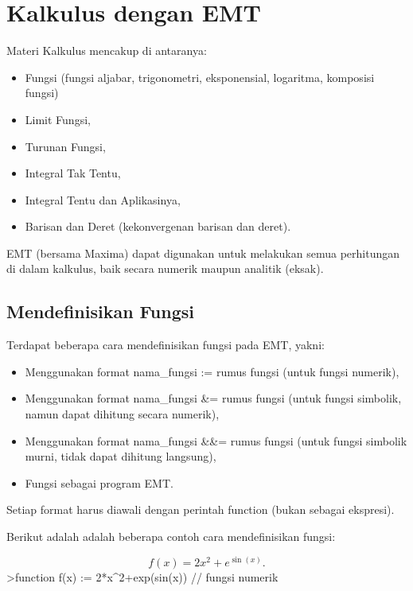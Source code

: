 \documentclass[
]{book}
\author{}
\date{}
\begin{document}
\frontmatter

\mainmatter
\chapter{Kalkulus dengan EMT}\label{kalkulus-dengan-emt}

Materi Kalkulus mencakup di antaranya:

\begin{itemize}
\item
  Fungsi (fungsi aljabar, trigonometri, eksponensial, logaritma, komposisi fungsi)
\item
  Limit Fungsi,
\item
  Turunan Fungsi,
\item
  Integral Tak Tentu,
\item
  Integral Tentu dan Aplikasinya,
\item
  Barisan dan Deret (kekonvergenan barisan dan deret).
\end{itemize}

EMT (bersama Maxima) dapat digunakan untuk melakukan semua perhitungan di dalam kalkulus, baik secara numerik maupun analitik (eksak).

\section{Mendefinisikan Fungsi}\label{mendefinisikan-fungsi}

Terdapat beberapa cara mendefinisikan fungsi pada EMT, yakni:

\begin{itemize}
\item
  Menggunakan format nama\_fungsi := rumus fungsi (untuk fungsi numerik),
\item
  Menggunakan format nama\_fungsi \&= rumus fungsi (untuk fungsi simbolik, namun dapat dihitung secara numerik),
\item
  Menggunakan format nama\_fungsi \&\&= rumus fungsi (untuk fungsi simbolik murni, tidak dapat dihitung langsung),
\item
  Fungsi sebagai program EMT.
\end{itemize}

Setiap format harus diawali dengan perintah function (bukan sebagai ekspresi).

Berikut adalah adalah beberapa contoh cara mendefinisikan fungsi:

\[f(x)=2x^2+e^{\sin(x)}.\]\textgreater function f(x) := 2*x\^{}2+exp(sin(x)) // fungsi numerik
\end{document}
